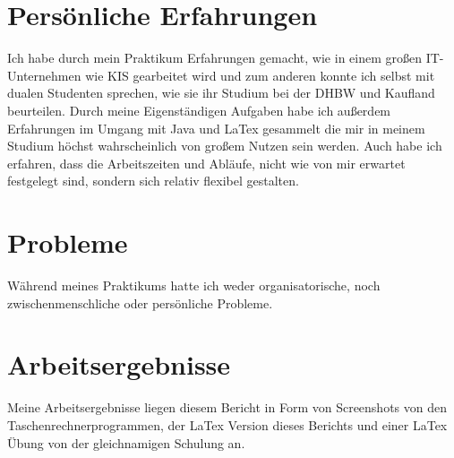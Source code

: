 \section{Persönliche Erfahrungen}

Ich habe durch mein Praktikum Erfahrungen gemacht, wie in einem großen IT-Unternehmen wie KIS gearbeitet wird und zum anderen konnte ich selbst mit dualen Studenten sprechen, wie sie ihr Studium bei der DHBW und Kaufland beurteilen. Durch meine Eigenständigen Aufgaben habe ich außerdem Erfahrungen im Umgang mit Java und LaTex gesammelt die mir in meinem Studium höchst wahrscheinlich von großem Nutzen sein werden. Auch habe ich erfahren, dass die Arbeitszeiten und Abläufe, nicht wie von mir erwartet festgelegt sind, sondern sich relativ flexibel gestalten. 

\section{Probleme}

Während meines Praktikums hatte ich weder organisatorische, noch zwischenmenschliche oder persönliche Probleme. 

\section{Arbeitsergebnisse}

Meine Arbeitsergebnisse liegen diesem Bericht in Form von Screenshots von den Taschenrechnerprogrammen, der LaTex Version dieses Berichts und einer LaTex Übung von der gleichnamigen Schulung an. 